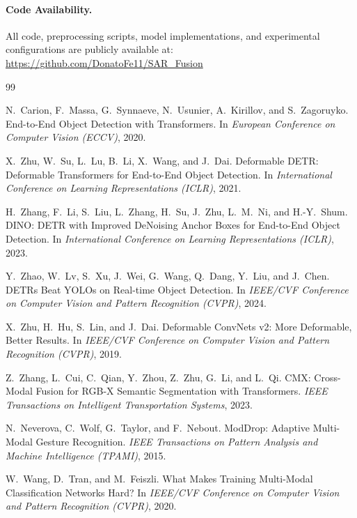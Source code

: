\documentclass[12pt, a4paper]{article}
\begin{document}
\paragraph{Code Availability.}
All code, preprocessing scripts, model implementations, and experimental configurations are publicly available at: \url{https://github.com/DonatoFe11/SAR_Fusion}


\begin{thebibliography}{99}

N.\ Carion, F.\ Massa, G.\ Synnaeve, N.\ Usunier, A.\ Kirillov, and S.\ Zagoruyko.
\newblock End-to-End Object Detection with Transformers.
\newblock In \textit{European Conference on Computer Vision (ECCV)}, 2020.

X.\ Zhu, W.\ Su, L.\ Lu, B.\ Li, X.\ Wang, and J.\ Dai.
\newblock Deformable DETR: Deformable Transformers for End-to-End Object Detection.
\newblock In \textit{International Conference on Learning Representations (ICLR)}, 2021.

H.\ Zhang, F.\ Li, S.\ Liu, L.\ Zhang, H.\ Su, J.\ Zhu, L.\ M.\ Ni, and H.-Y.\ Shum.
\newblock DINO: DETR with Improved DeNoising Anchor Boxes for End-to-End Object Detection.
\newblock In \textit{International Conference on Learning Representations (ICLR)}, 2023.

Y.\ Zhao, W.\ Lv, S.\ Xu, J.\ Wei, G.\ Wang, Q.\ Dang, Y.\ Liu, and J.\ Chen.
\newblock DETRs Beat YOLOs on Real-time Object Detection.
\newblock In \textit{IEEE/CVF Conference on Computer Vision and Pattern Recognition (CVPR)}, 2024.

X.\ Zhu, H.\ Hu, S.\ Lin, and J.\ Dai.
\newblock Deformable ConvNets v2: More Deformable, Better Results.
\newblock In \textit{IEEE/CVF Conference on Computer Vision and Pattern Recognition (CVPR)}, 2019.

Z.\ Zhang, L.\ Cui, C.\ Qian, Y.\ Zhou, Z.\ Zhu, G.\ Li, and L.\ Qi.
\newblock CMX: Cross-Modal Fusion for RGB-X Semantic Segmentation with Transformers.
\newblock \textit{IEEE Transactions on Intelligent Transportation Systems}, 2023.

N.\ Neverova, C.\ Wolf, G.\ Taylor, and F.\ Nebout.
\newblock ModDrop: Adaptive Multi-Modal Gesture Recognition.
\newblock \textit{IEEE Transactions on Pattern Analysis and Machine Intelligence (TPAMI)}, 2015.

W.\ Wang, D.\ Tran, and M.\ Feiszli.
\newblock What Makes Training Multi-Modal Classification Networks Hard?
\newblock In \textit{IEEE/CVF Conference on Computer Vision and Pattern Recognition (CVPR)}, 2020.

\end{thebibliography}
\end{document}
